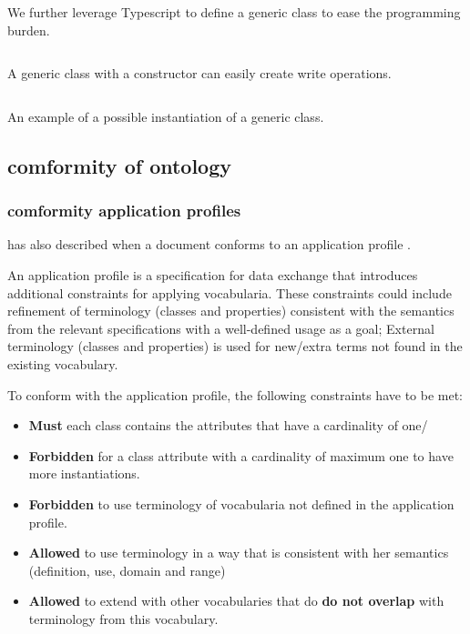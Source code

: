 We further leverage Typescript to define a generic class to ease the programming burden. 

\begin{listing}[H]
    \inputminted[linenos,frame=single,breaklines]{TypeScript}{code/type_write_op.ts}
    \caption{A generic class with a constructor can easily create write operations.}
\end{listing}

\begin{listing}[H]
    \inputminted[linenos,frame=single,breaklines]{TypeScript}{code/type_write_op_instan.ts}
    \caption{An example of a possible instantiation of a generic class.}
\end{listing}

\subsection{comformity of ontology}
\subsubsection{comformity application profiles}
 has also described when a  document conforms to an application profile \cite{noauthor_conformiteit_nodate}.

An application profile is a specification for data exchange that introduces additional constraints for applying vocabularia. These constraints could include refinement of terminology (classes and properties) consistent with the semantics from the relevant specifications with a well-defined usage as a goal;
    External terminology (classes and properties) is used for new/extra terms not found in the existing vocabulary.

To conform with the  application profile, the following constraints have to be met:
\begin{itemize}
    \item \textbf{Must} each class contains the attributes that have a cardinality of one/
    \item \textbf{Forbidden} for a class attribute with a cardinality of maximum one to have more instantiations.
    \item \textbf{Forbidden} to use terminology of vocabularia not defined in the application profile.
    \item \textbf{Allowed} to use terminology in a way that is consistent with her semantics (definition, use, domain and range)
    \item \textbf{Allowed} to extend with other vocabularies that do \textbf{do not overlap} with terminology from this vocabulary. 
\end{itemize}
